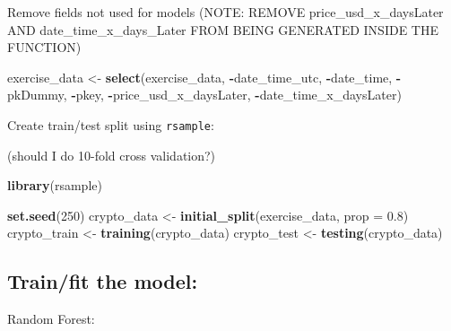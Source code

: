 \documentclass[
]{book}
\newenvironment{Shaded}{\begin{snugshade}}{\end{snugshade}}
\newcommand{\DataTypeTok}[1]{\textcolor[rgb]{0.13,0.29,0.53}{#1}}
\newcommand{\DecValTok}[1]{\textcolor[rgb]{0.00,0.00,0.81}{#1}}
\newcommand{\FloatTok}[1]{\textcolor[rgb]{0.00,0.00,0.81}{#1}}
\newcommand{\KeywordTok}[1]{\textcolor[rgb]{0.13,0.29,0.53}{\textbf{#1}}}
\newcommand{\NormalTok}[1]{#1}
\newcommand{\OperatorTok}[1]{\textcolor[rgb]{0.81,0.36,0.00}{\textbf{#1}}}
\newcommand{\StringTok}[1]{\textcolor[rgb]{0.31,0.60,0.02}{#1}}
\begin{document}
Remove fields not used for models (NOTE: REMOVE price\_usd\_x\_daysLater AND date\_time\_x\_days\_Later FROM BEING GENERATED INSIDE THE FUNCTION)

\begin{Shaded}
\begin{Highlighting}[]
\NormalTok{exercise_data <-}\StringTok{ }\KeywordTok{select}\NormalTok{(exercise_data, }\OperatorTok{-}\NormalTok{date_time_utc, }\OperatorTok{-}\NormalTok{date_time, }\OperatorTok{-}\NormalTok{pkDummy, }\OperatorTok{-}\NormalTok{pkey, }\OperatorTok{-}\NormalTok{price_usd_x_daysLater, }\OperatorTok{-}\NormalTok{date_time_x_daysLater)}
\end{Highlighting}
\end{Shaded}

Create train/test split using \texttt{rsample}\citep{R-rsample}:

(should I do 10-fold cross validation?)

\begin{Shaded}
\begin{Highlighting}[]
\KeywordTok{library}\NormalTok{(rsample)}

\KeywordTok{set.seed}\NormalTok{(}\DecValTok{250}\NormalTok{)}
\NormalTok{crypto_data <-}\StringTok{ }\KeywordTok{initial_split}\NormalTok{(exercise_data, }\DataTypeTok{prop =} \FloatTok{0.8}\NormalTok{)}
\NormalTok{crypto_train <-}\StringTok{ }\KeywordTok{training}\NormalTok{(crypto_data)}
\NormalTok{crypto_test  <-}\StringTok{  }\KeywordTok{testing}\NormalTok{(crypto_data)}
\end{Highlighting}
\end{Shaded}

\hypertarget{trainfit-the-model}{%
\subsection{Train/fit the model:}\label{trainfit-the-model}}

\begin{Shaded}
\end{Shaded}

Random Forest:

\begin{Shaded}
\end{Shaded}
\end{document}

